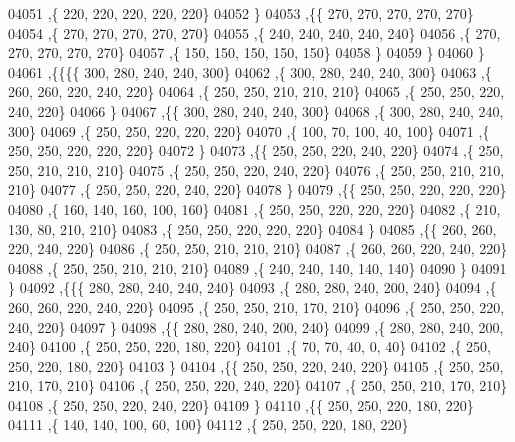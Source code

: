 \begin{DoxyCode}
04051     ,\{   220,   220,   220,   220,   220\}
04052     \}
04053    ,\{\{   270,   270,   270,   270,   270\}
04054     ,\{   270,   270,   270,   270,   270\}
04055     ,\{   240,   240,   240,   240,   240\}
04056     ,\{   270,   270,   270,   270,   270\}
04057     ,\{   150,   150,   150,   150,   150\}
04058     \}
04059    \}
04060   \}
04061  ,\{\{\{\{   300,   280,   240,   240,   300\}
04062     ,\{   300,   280,   240,   240,   300\}
04063     ,\{   260,   260,   220,   240,   220\}
04064     ,\{   250,   250,   210,   210,   210\}
04065     ,\{   250,   250,   220,   240,   220\}
04066     \}
04067    ,\{\{   300,   280,   240,   240,   300\}
04068     ,\{   300,   280,   240,   240,   300\}
04069     ,\{   250,   250,   220,   220,   220\}
04070     ,\{   100,    70,   100,    40,   100\}
04071     ,\{   250,   250,   220,   220,   220\}
04072     \}
04073    ,\{\{   250,   250,   220,   240,   220\}
04074     ,\{   250,   250,   210,   210,   210\}
04075     ,\{   250,   250,   220,   240,   220\}
04076     ,\{   250,   250,   210,   210,   210\}
04077     ,\{   250,   250,   220,   240,   220\}
04078     \}
04079    ,\{\{   250,   250,   220,   220,   220\}
04080     ,\{   160,   140,   160,   100,   160\}
04081     ,\{   250,   250,   220,   220,   220\}
04082     ,\{   210,   130,    80,   210,   210\}
04083     ,\{   250,   250,   220,   220,   220\}
04084     \}
04085    ,\{\{   260,   260,   220,   240,   220\}
04086     ,\{   250,   250,   210,   210,   210\}
04087     ,\{   260,   260,   220,   240,   220\}
04088     ,\{   250,   250,   210,   210,   210\}
04089     ,\{   240,   240,   140,   140,   140\}
04090     \}
04091    \}
04092   ,\{\{\{   280,   280,   240,   240,   240\}
04093     ,\{   280,   280,   240,   200,   240\}
04094     ,\{   260,   260,   220,   240,   220\}
04095     ,\{   250,   250,   210,   170,   210\}
04096     ,\{   250,   250,   220,   240,   220\}
04097     \}
04098    ,\{\{   280,   280,   240,   200,   240\}
04099     ,\{   280,   280,   240,   200,   240\}
04100     ,\{   250,   250,   220,   180,   220\}
04101     ,\{    70,    70,    40,     0,    40\}
04102     ,\{   250,   250,   220,   180,   220\}
04103     \}
04104    ,\{\{   250,   250,   220,   240,   220\}
04105     ,\{   250,   250,   210,   170,   210\}
04106     ,\{   250,   250,   220,   240,   220\}
04107     ,\{   250,   250,   210,   170,   210\}
04108     ,\{   250,   250,   220,   240,   220\}
04109     \}
04110    ,\{\{   250,   250,   220,   180,   220\}
04111     ,\{   140,   140,   100,    60,   100\}
04112     ,\{   250,   250,   220,   180,   220\}

\end{DoxyCode}
